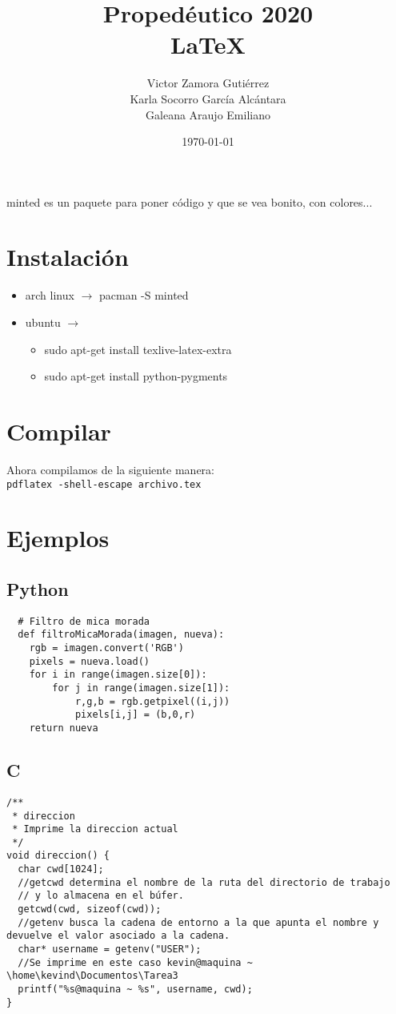 \documentclass[spanish,12pt,letterpaper]{article}
\title{Propedéutico 2020 \\ \LaTeX}
\author{Victor Zamora Gutiérrez \\ Karla Socorro García Alcántara\\
  Galeana Araujo Emiliano}
\affil{Facultad de ciencias, UNAM}
\date{\today}
\begin{document}
\maketitle

minted es un paquete para poner código y que se vea bonito, con colores...\\

\section{Instalación}
\begin{itemize}
\item arch linux $\rightarrow$ pacman -S minted
\item ubuntu $\rightarrow$
  \begin{itemize}
  \item sudo apt-get install texlive-latex-extra
  \item sudo apt-get install python-pygments
  \end{itemize}
\end{itemize}

\section{Compilar}
Ahora compilamos de la siguiente manera:\\
\verb!pdflatex -shell-escape archivo.tex!

\section{Ejemplos}
\subsection{Python}
\begin{verbatim}
  # Filtro de mica morada
  def filtroMicaMorada(imagen, nueva):
    rgb = imagen.convert('RGB')
    pixels = nueva.load()
    for i in range(imagen.size[0]):
        for j in range(imagen.size[1]):
            r,g,b = rgb.getpixel((i,j))
            pixels[i,j] = (b,0,r)
    return nueva
\end{verbatim}

\subsection{C}
\begin{verbatim}
/**
 * direccion
 * Imprime la direccion actual
 */
void direccion() {
  char cwd[1024];
  //getcwd determina el nombre de la ruta del directorio de trabajo
  // y lo almacena en el búfer.
  getcwd(cwd, sizeof(cwd));
  //getenv busca la cadena de entorno a la que apunta el nombre y devuelve el valor asociado a la cadena.
  char* username = getenv("USER");
  //Se imprime en este caso kevin@maquina ~ \home\kevind\Documentos\Tarea3
  printf("%s@maquina ~ %s", username, cwd);
}
\end{verbatim}
\end{document}
